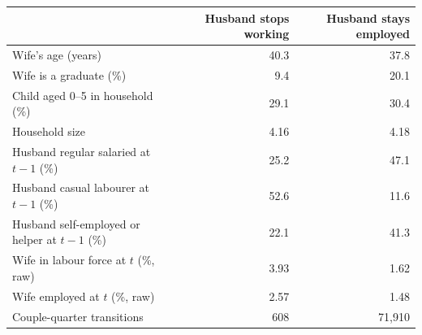 \begin{tabular}{lrr}
\toprule
 & Husband stops working & Husband stays employed \\
\midrule
Wife's age (years) & 40.3 & 37.8 \\
Wife is a graduate (\%) & 9.4 & 20.1 \\
Child aged 0--5 in household (\%) & 29.1 & 30.4 \\
Household size & 4.16 & 4.18 \\
Husband regular salaried at $t-1$ (\%) & 25.2 & 47.1 \\
Husband casual labourer at $t-1$ (\%) & 52.6 & 11.6 \\
Husband self-employed or helper at $t-1$ (\%) & 22.1 & 41.3 \\
Wife in labour force at $t$ (\%, raw) & 3.93 & 1.62 \\
Wife employed at $t$ (\%, raw) & 2.57 & 1.48 \\
Couple-quarter transitions & 608 & 71,910 \\
\bottomrule
\end{tabular}
